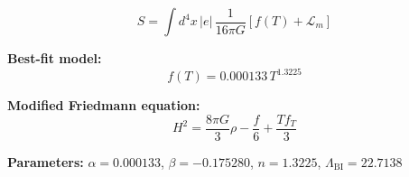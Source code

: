 
\begin{equation}
  S = \int d^4x \, |e| \, \frac{1}{16\pi G} \left[ f(T) + \mathcal{L}_m \right]
\end{equation}

\textbf{Best-fit model:}
\begin{equation}
  f(T) = 0.000133 \, T^{1.3225}
\end{equation}

\textbf{Modified Friedmann equation:}
\begin{equation}
  H^2 = \frac{8\pi G}{3} \rho - \frac{f}{6} + \frac{T f_T}{3}
\end{equation}

\textbf{Parameters:}
$\alpha = 0.000133$, \quad
$\beta = -0.175280$, \quad
$n = 1.3225$, \quad
$\Lambda_{\text{BI}} = 22.7138$